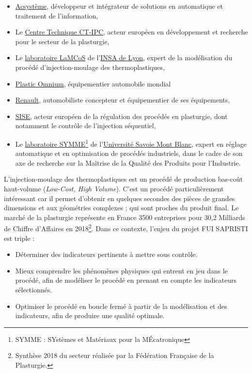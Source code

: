 \begin{itemize}
\item \href{http://www.acsysteme.com/}{Acsystème}, développeur et intégrateur de solutions en automatique et traitement de l'information,
\item Le \href{https://ct-ipc.com/}{Centre Technique CT-IPC}, acteur européen en développement et recherche pour le secteur de la plasturgie,
\item Le \href{https://lamcos.insa-lyon.fr/}{laboratoire LaMCoS} de l'\href{https://www.insa-lyon.fr/}{INSA de Lyon}, expert de la modélisation du procédé d'injection-moulage des thermoplastiques,
\item \href{https://www.plasticomnium.com/}{Plastic Omnium}, équipementier automobile mondial
\item \href{https://www.renault.fr/}{Renault}, automobiliste concepteur et équipementier de ses équipements,
\item \href{http://www.sise-plastics.com/}{SISE}, acteur européen de la régulation des procédés en plasturgie, dont notamment le contrôle de l'injection séquentiel,
\item Le \href{http://www.symme.univ-smb.fr/}{laboratoire SYMME}\footnote{SYMME : SYstèmes et Matériaux pour la MÉcatronique} de l'\href{https://www.univ-smb.fr/}{Université Savoie Mont Blanc}, expert en réglage automatique et en optimisation de procédés industriels, dans le cadre de son axe de recherche sur la Maîtrise de la Qualité des Produits pour l'Industrie.
\end{itemize}

L'injection-moulage des thermoplastiques est un procédé de production bas-coût haut-volume (\textit{Low-Cost, High Volume}).
C'est un procédé particulièrement intéressant car il permet d'obtenir en quelques secondes des pièces de grandes dimensions et aux géométries complexes ; qui sont proches du produit final.
Le marché de la plasturgie représente en France 3500 entreprises pour 30,2 Milliards de Chiffre d'Affaires en 2018\footnote{Synthèse 2018 du secteur réalisée par la Fédération Française de la Plasturgie.}.
Dans ce contexte, l’enjeu du projet FUI SAPRISTI est triple :
\begin{itemize}
	\item Déterminer des indicateurs pertinents à mettre sous contrôle.
	\item Mieux comprendre les phénomènes physiques qui entrent en jeu dans le procédé, afin de modéliser le procédé en prenant en compte les indicateurs sélectionnés.
	\item Optimiser le procédé en boucle fermé à partir de la modélisation et des indicateurs, afin de produire une qualité optimale.
\end{itemize}

